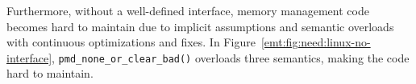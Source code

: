 Furthermore, without a well-defined interface, memory management code becomes hard to maintain
	due to implicit assumptions and semantic overloads with continuous optimizations and fixes.
In Figure~\ref{emt:fig:need:linux-no-interface}, \texttt{\small pmd\_none\_or\_clear\_bad()} 
	overloads three semantics, making the code hard to maintain.

